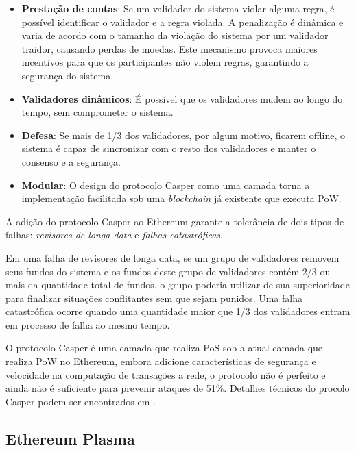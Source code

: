 \documentclass[tcc,capa]{texufpel}
\begin{document}
    \begin{itemize}
        \item \textbf{Prestação de contas}: Se um validador do sistema violar alguma regra, é possível identificar o validador e a regra violada. A penalização é dinâmica e varia de acordo com o tamanho da violação do sistema por um validador traidor, causando perdas de moedas. Este mecanismo provoca maiores incentivos para que os participantes não violem regras, garantindo a segurança do sistema.
        \item \textbf{Validadores dinâmicos}: É possível que os validadores mudem ao longo do tempo, sem comprometer o sistema.
        \item \textbf{Defesa}: Se mais de 1/3 dos validadores, por algum motivo, ficarem offline, o sistema é capaz de sincronizar com o resto dos validadores e manter o consenso e a segurança.
        \item \textbf{Modular}: O design do protocolo Casper como uma camada torna a implementação facilitada sob uma \textit{blockchain} já existente que executa PoW.
    \end{itemize}
    
    A adição do protocolo Casper ao Ethereum garante a tolerância de dois tipos de falhas: \textit{revisores de longa data} e \textit{falhas catastróficas}.
    
    Em uma falha de revisores de longa data, se um grupo de validadores removem seus fundos do sistema e os fundos deste grupo de validadores contém 2/3 ou mais da quantidade total de fundos, o grupo poderia utilizar de sua superioridade para finalizar situações conflitantes sem que sejam punidos. Uma falha catastrófica ocorre quando uma quantidade maior que 1/3 dos validadores entram em processo de falha ao mesmo tempo.
    
    O protocolo Casper é uma camada que realiza PoS sob a atual camada que realiza PoW no Ethereum, embora adicione características de segurança e velocidade na computação de transações a rede, o protocolo não é perfeito e ainda não é suficiente para prevenir ataques de 51\%. Detalhes técnicos do procolo Casper podem ser encontrados em \cite{buterin2017}.
    
    
    \subsection{Ethereum Plasma}\label{ssc:ethereum-plasma}
    
\end{document}
